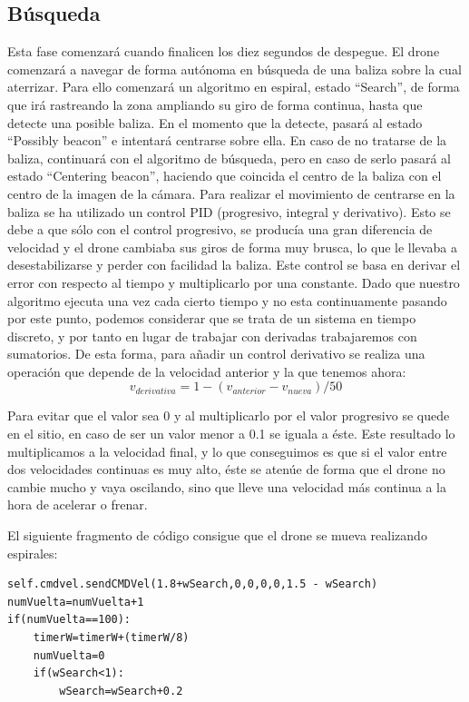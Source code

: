 \subsection{B\'usqueda}
\hspace{1 cm} Esta fase comenzar\'a cuando finalicen los diez segundos de despegue. El drone comenzar\'a a navegar de forma aut\'onoma en b\'usqueda de una baliza sobre la cual aterrizar. Para ello comenzar\'a un algoritmo en espiral, estado "`Search"', de forma que ir\'a rastreando la zona ampliando su giro de forma continua, hasta que detecte una posible baliza. En el momento que la detecte, pasar\'a al estado "`Possibly beacon"' e intentar\'a centrarse sobre ella. En caso de no tratarse de la baliza, continuar\'a con el algoritmo de b\'usqueda, pero en caso de serlo pasar\'a al estado "`Centering beacon"', haciendo que coincida el centro de la baliza con el centro de la imagen de la c\'amara. Para realizar el movimiento de centrarse en la baliza se ha utilizado un control PID (progresivo, integral y derivativo). Esto se debe a que s\'olo con el control progresivo, se produc\'ia una gran diferencia de velocidad y el drone cambiaba sus giros de forma muy brusca, lo que le llevaba a desestabilizarse y perder con facilidad la baliza.  Este control se basa en derivar el error con respecto al tiempo y multiplicarlo por una constante. Dado que nuestro algoritmo ejecuta una vez cada cierto tiempo y no esta continuamente pasando por este punto, podemos considerar que se trata de un sistema en tiempo discreto, y por tanto en lugar de trabajar con derivadas trabajaremos con sumatorios. De esta forma, para añadir un control derivativo se realiza una operaci\'on que depende de la velocidad anterior y la que tenemos ahora: \[v_{derivativa} =1-(v_{anterior}-v_{nueva})/50 \] 

\hspace{1cm}Para evitar que el valor sea 0 y al multiplicarlo por el valor progresivo se quede en el sitio, en caso de ser un valor menor a 0.1 se iguala a \'este. Este resultado lo multiplicamos a la velocidad final, y lo que conseguimos es que si el valor entre dos velocidades continuas es muy alto, \'este se aten\'ue de forma que el drone no cambie mucho y vaya oscilando, sino que lleve una velocidad m\'as continua a la hora de acelerar o frenar.  

El siguiente fragmento de c\'odigo consigue que el drone se mueva realizando espirales:

\begin{lstlisting}[backgroundcolor=\color{yellow}]
self.cmdvel.sendCMDVel(1.8+wSearch,0,0,0,0,1.5 - wSearch)
numVuelta=numVuelta+1
if(numVuelta==100):
    timerW=timerW+(timerW/8)
    numVuelta=0
    if(wSearch<1):
        wSearch=wSearch+0.2
\end{lstlisting}

